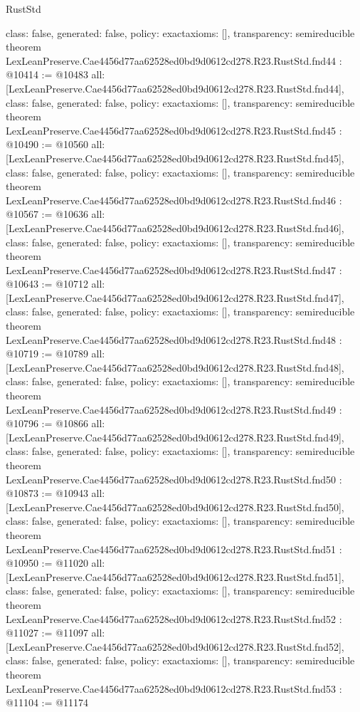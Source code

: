 \begin{lexlean}{RustStd}
\begin{coremodule}
{  class: false,
  generated: false,
  policy: exact{axioms: []},
  transparency: semireducible
}
theorem LexLeanPreserve.Cae4456d77aa62528ed0bd9d0612cd278.R23.RustStd.fnd44 : @10414 := @10483 {
  all: [LexLeanPreserve.Cae4456d77aa62528ed0bd9d0612cd278.R23.RustStd.fnd44],
  class: false,
  generated: false,
  policy: exact{axioms: []},
  transparency: semireducible
}
theorem LexLeanPreserve.Cae4456d77aa62528ed0bd9d0612cd278.R23.RustStd.fnd45 : @10490 := @10560 {
  all: [LexLeanPreserve.Cae4456d77aa62528ed0bd9d0612cd278.R23.RustStd.fnd45],
  class: false,
  generated: false,
  policy: exact{axioms: []},
  transparency: semireducible
}
theorem LexLeanPreserve.Cae4456d77aa62528ed0bd9d0612cd278.R23.RustStd.fnd46 : @10567 := @10636 {
  all: [LexLeanPreserve.Cae4456d77aa62528ed0bd9d0612cd278.R23.RustStd.fnd46],
  class: false,
  generated: false,
  policy: exact{axioms: []},
  transparency: semireducible
}
theorem LexLeanPreserve.Cae4456d77aa62528ed0bd9d0612cd278.R23.RustStd.fnd47 : @10643 := @10712 {
  all: [LexLeanPreserve.Cae4456d77aa62528ed0bd9d0612cd278.R23.RustStd.fnd47],
  class: false,
  generated: false,
  policy: exact{axioms: []},
  transparency: semireducible
}
theorem LexLeanPreserve.Cae4456d77aa62528ed0bd9d0612cd278.R23.RustStd.fnd48 : @10719 := @10789 {
  all: [LexLeanPreserve.Cae4456d77aa62528ed0bd9d0612cd278.R23.RustStd.fnd48],
  class: false,
  generated: false,
  policy: exact{axioms: []},
  transparency: semireducible
}
theorem LexLeanPreserve.Cae4456d77aa62528ed0bd9d0612cd278.R23.RustStd.fnd49 : @10796 := @10866 {
  all: [LexLeanPreserve.Cae4456d77aa62528ed0bd9d0612cd278.R23.RustStd.fnd49],
  class: false,
  generated: false,
  policy: exact{axioms: []},
  transparency: semireducible
}
theorem LexLeanPreserve.Cae4456d77aa62528ed0bd9d0612cd278.R23.RustStd.fnd50 : @10873 := @10943 {
  all: [LexLeanPreserve.Cae4456d77aa62528ed0bd9d0612cd278.R23.RustStd.fnd50],
  class: false,
  generated: false,
  policy: exact{axioms: []},
  transparency: semireducible
}
theorem LexLeanPreserve.Cae4456d77aa62528ed0bd9d0612cd278.R23.RustStd.fnd51 : @10950 := @11020 {
  all: [LexLeanPreserve.Cae4456d77aa62528ed0bd9d0612cd278.R23.RustStd.fnd51],
  class: false,
  generated: false,
  policy: exact{axioms: []},
  transparency: semireducible
}
theorem LexLeanPreserve.Cae4456d77aa62528ed0bd9d0612cd278.R23.RustStd.fnd52 : @11027 := @11097 {
  all: [LexLeanPreserve.Cae4456d77aa62528ed0bd9d0612cd278.R23.RustStd.fnd52],
  class: false,
  generated: false,
  policy: exact{axioms: []},
  transparency: semireducible
}
theorem LexLeanPreserve.Cae4456d77aa62528ed0bd9d0612cd278.R23.RustStd.fnd53 : @11104 := @11174 {
}
\end{coremodule}
\end{lexlean}
